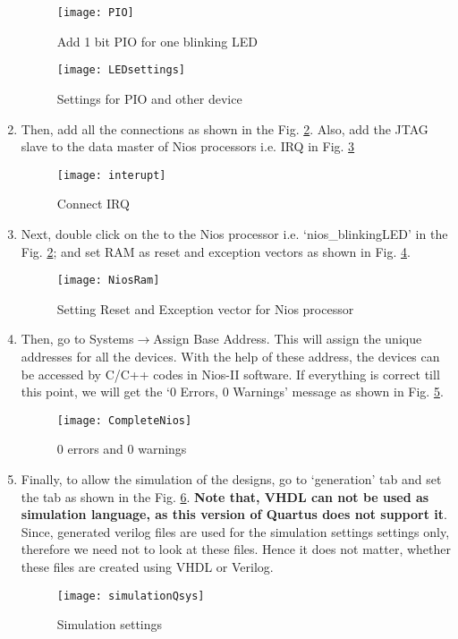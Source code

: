 \begin{enumerate}
	\begin{figure}[!h]
		\centering
		\texttt{[image: PIO]}
		\caption{Add 1 bit PIO for one blinking LED}
		\label{fig:PIO}
	\end{figure}
	
	\begin{figure}[!h]
		\centering
		\texttt{[image: LEDsettings]}
		\caption{Settings for PIO and other device}
		\label{fig:LEDsettings}
	\end{figure}
	
	\item Then, add all the connections as shown in the Fig. \ref{fig:LEDsettings}. Also, add the JTAG slave to the data master of Nios processors i.e. IRQ in Fig. \ref{fig:interupt}
	
	\begin{figure}[!h]
		\centering
		\texttt{[image: interupt]}
		\caption{Connect IRQ}
		\label{fig:interupt}
	\end{figure}
	
	\item Next, double click on the to the Nios processor i.e. `nios\_blinkingLED' in the Fig. \ref{fig:LEDsettings}; and set RAM as reset and exception vectors as shown in Fig. \ref{fig:NiosRam}.
	\begin{figure}[!h]
		\centering
		\texttt{[image: NiosRam]}
		\caption{Setting Reset and Exception vector for Nios processor}
		\label{fig:NiosRam}
	\end{figure}
	
	
	\item Then, go to Systems$\rightarrow$Assign Base Address. This will assign the unique addresses for all the devices. With the help of these address, the devices can be accessed by C/C++ codes in Nios-II software. If everything is correct till this point, we will get the `0 Errors, 0 Warnings' message as shown in Fig. \ref{fig:CompleteNios}.
	\begin{figure}[!h]
		\centering
		\texttt{[image: CompleteNios]}
		\caption{0 errors and 0 warnings}
		\label{fig:CompleteNios}
	\end{figure}
	
	
	\item Finally, to allow the simulation of the designs, go to `generation' tab and set the tab as shown in the Fig. \ref{fig:simulationQsys}. \textbf{Note that, VHDL can not be used as simulation language, as this version of Quartus does not support it}. Since,  generated verilog files are used for the simulation settings settings only, therefore we need not to look at these files. Hence it does not matter, whether these files are created using VHDL or Verilog. 
	\begin{figure}[!h]
		\centering
		\texttt{[image: simulationQsys]}
		\caption{Simulation settings}
		\label{fig:simulationQsys}
	\end{figure}
	

\end{enumerate}
